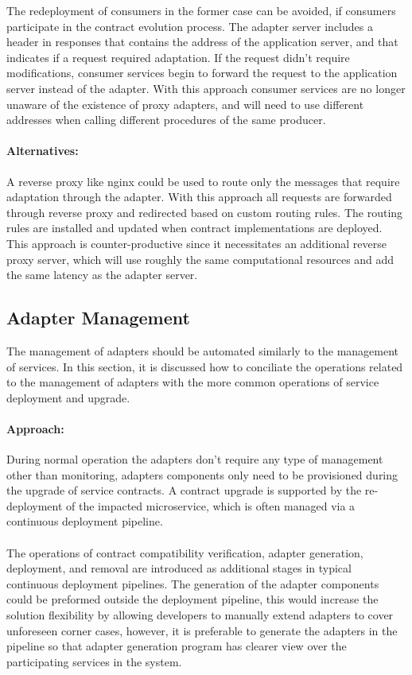 The redeployment of consumers in the former case can be avoided, if consumers participate in the contract evolution process.
The adapter server includes a header in responses that contains the address of the application server, and that indicates if a request required adaptation.
If the request didn't require modifications, consumer services begin to forward the request to the application server instead of the adapter.
With this approach consumer services are no longer unaware of the existence of proxy adapters,
and will need to use different addresses when calling different procedures of the same producer.

\paragraph{Alternatives:}
A reverse proxy like nginx could be used to route only the messages that require adaptation through the adapter.
With this approach all requests are forwarded through reverse proxy and redirected based on custom routing rules.
The routing rules are installed and updated when contract implementations are deployed.
This approach is counter-productive since it necessitates an additional reverse proxy server,
which will use roughly the same computational resources and add the same latency as the adapter server.

\subsection{Adapter Management} %
\label{sec:adapter_management}

The management of adapters should be automated similarly to the management of services.
In this section, it is discussed how to conciliate the operations related to the management of adapters with the more common operations of service deployment and upgrade.

\paragraph{Approach:}
During normal operation the adapters don't require any type of management other than monitoring,
adapters components only need to be provisioned during the upgrade of service contracts.
A contract upgrade is supported by the re-deployment of the impacted microservice, which is often managed via a continuous deployment pipeline.

\paragraph{}

The operations of contract compatibility verification, adapter generation, deployment,
and removal are introduced as additional stages in typical continuous deployment pipelines.
The generation of the adapter components could be preformed outside the deployment pipeline,
this would increase the solution flexibility by allowing developers to manually extend adapters to cover unforeseen corner cases,
however, it is preferable to generate the adapters in the pipeline so that adapter generation program has clearer view
over the participating services in the system.
